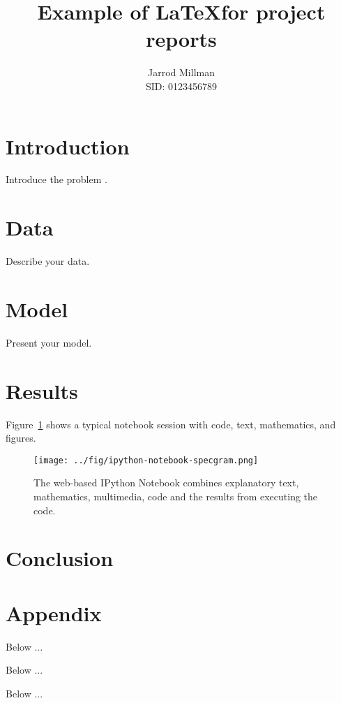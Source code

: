 \documentclass{article}
\begin{document}
\title{Example of \LaTeX for project reports}
\author{Jarrod Millman\\
        SID: 0123456789}
\maketitle
\thispagestyle{fancy}

\begin{abstract}
\lipsum[1]
\end{abstract}

\section{Introduction}

Introduce the problem \cite{boswell2011art}.
\lipsum[1]

\section{Data}

Describe your data.
\lipsum[1]

\section{Model}

Present your model.
\lipsum[1]

\section{Results}

Figure~\ref{fig:IPython-notebook} shows a typical notebook session with code,
text, mathematics, and figures.

\begin{figure}
  \begin{centering}
    \texttt{[image: ../fig/ipython-notebook-specgram.png]}\par
  \end{centering}

  \caption{\label{fig:IPython-notebook}The web-based IPython Notebook combines
    explanatory text, mathematics, multimedia, code and the results from
    executing the code.}
\end{figure}

\section{Conclusion}

\lipsum[1]




\clearpage
\appendix

\section*{Appendix}

Below ...


Below ...


Below ...

\end{document}
